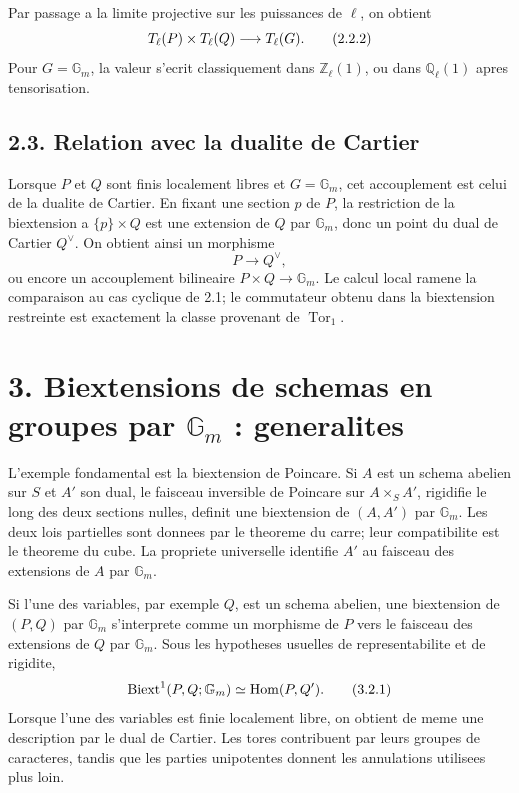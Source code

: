\documentclass[11pt]{article}
\providecommand{\Tor}{\operatorname{Tor}}
\providecommand{\Ql}{\mathbb Q_\ell}
\providecommand{\Zl}{\mathbb Z_\ell}
\providecommand{\Gm}{\mathbb G_m}
\providecommand{\Hom}{\operatorname{Hom}}
\begin{document}
Par passage a la limite projective sur les puissances de \(\ell\), on obtient
\[
        T_\ell(P)\times T_\ell(Q)
        \longrightarrow T_\ell(G).
\qquad\text{(2.2.2)}
\]
Pour \(G=\Gm\), la valeur s'ecrit classiquement dans \(\Zl(1)\), ou dans \(\Ql(1)\) apres tensorisation.

\subsection*{2.3. Relation avec la dualite de Cartier}

Lorsque \(P\) et \(Q\) sont finis localement libres et \(G=\Gm\), cet accouplement est celui de la dualite de Cartier.  En fixant une section \(p\) de \(P\), la restriction de la biextension a \(\{p\}\times Q\) est une extension de \(Q\) par \(\Gm\), donc un point du dual de Cartier \(Q^\vee\).  On obtient ainsi un morphisme
\[
        P\longrightarrow Q^\vee,
\]
ou encore un accouplement bilineaire \(P\times Q\to\Gm\).  Le calcul local ramene la comparaison au cas cyclique de 2.1; le commutateur obtenu dans la biextension restreinte est exactement la classe provenant de \(\Tor_1\).

\section*{3. Biextensions de schemas en groupes par \(\Gm\) : generalites}

L'exemple fondamental est la biextension de Poincare.  Si \(A\) est un schema abelien sur \(S\) et \(A'\) son dual, le faisceau inversible de Poincare sur \(A\times_S A'\), rigidifie le long des deux sections nulles, definit une biextension de \((A,A')\) par \(\Gm\).  Les deux lois partielles sont donnees par le theoreme du carre; leur compatibilite est le theoreme du cube.  La propriete universelle identifie \(A'\) au faisceau des extensions de \(A\) par \(\Gm\).

Si l'une des variables, par exemple \(Q\), est un schema abelien, une biextension de \((P,Q)\) par \(\Gm\) s'interprete comme un morphisme de \(P\) vers le faisceau des extensions de \(Q\) par \(\Gm\).  Sous les hypotheses usuelles de representabilite et de rigidite,
\[
        \Biext^1(P,Q;\Gm)\simeq \Hom(P,Q').
\qquad\text{(3.2.1)}
\]
Lorsque l'une des variables est finie localement libre, on obtient de meme une description par le dual de Cartier.  Les tores contribuent par leurs groupes de caracteres, tandis que les parties unipotentes donnent les annulations utilisees plus loin.
\end{document}
